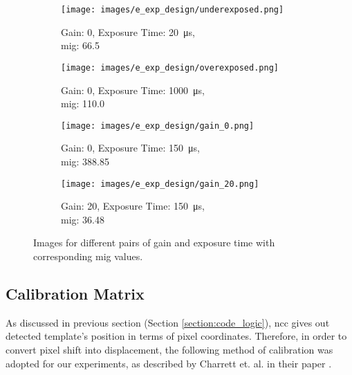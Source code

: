     \begin{figure}[h]
        \centering
        \begin{subfigure}[b]{0.4\textwidth}
            \centering
            \texttt{[image: images/e\_exp\_design/underexposed.png]}
            \caption{Gain: 0, Exposure Time: \SI{20}{\micro\second},\\\gls{mig}: 66.5}
            \label{subfig:underexposed.png}
        \end{subfigure}
        \hspace{1cm}
        \begin{subfigure}[b]{0.4\textwidth}
            \centering
            \texttt{[image: images/e\_exp\_design/overexposed.png]}
            \caption{Gain: 0, Exposure Time: \SI{1000}{\micro\second},\\\gls{mig}: 110.0}
            \label{subfig:underexposed.png}
        \end{subfigure}

        \vspace{5mm}
        
        \begin{subfigure}[b]{0.4\textwidth}
            \centering
            \texttt{[image: images/e\_exp\_design/gain\_0.png]}
            \caption{Gain: 0, Exposure Time: \SI{150}{\micro\second},\\\gls{mig}: 388.85}
            \label{subfig:underexposed.png}
        \end{subfigure}
        \hspace{1cm}
        \begin{subfigure}[b]{0.4\textwidth}
            \centering
            \texttt{[image: images/e\_exp\_design/gain\_20.png]}
            \caption{Gain: 20, Exposure Time: \SI{150}{\micro\second},\\\gls{mig}: 36.48}
            \label{subfig:underexposed.png}
        \end{subfigure}
        \caption{Images for different pairs of gain and exposure time with corresponding \gls{mig} values.}
    \end{figure}

\subsection*{Calibration Matrix}
    As discussed in previous section (Section \ref{section:code_logic}), \gls{ncc} gives out detected template's position in terms of pixel coordinates. Therefore, in order to convert pixel shift into displacement, the following method of calibration was adopted for our experiments, as described by Charrett et. al. in their paper \cite{charrett_2018}.

